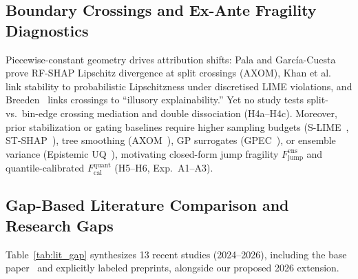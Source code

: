 \documentclass[conference]{IEEEtran}
\begin{document}
\subsection{Boundary Crossings and Ex-Ante Fragility Diagnostics}
Piecewise-constant geometry drives attribution shifts: Pala and Garc\'{i}a-Cuesta~\cite{pala2024} prove RF-SHAP Lipschitz divergence at split crossings (AXOM), Khan et al.~\cite{khan2024} link stability to probabilistic Lipschitzness under discretised LIME violations, and Breeden~\cite{breeden2026} links crossings to ``illusory explainability.'' Yet no study tests split- vs.\ bin-edge crossing mediation and double dissociation (H4a--H4c). Moreover, prior stabilization or gating baselines require higher sampling budgets (S-LIME~\cite{zhou2021}, ST-SHAP~\cite{kelodjou2024}), tree smoothing (AXOM~\cite{pala2024}), GP surrogates (GPEC~\cite{hill2024}), or ensemble variance (Epistemic UQ~\cite{mikriukov2026}), motivating closed-form jump fragility $F_{\mathrm{jump}}^{\mathrm{ens}}$ and quantile-calibrated $F_{\mathrm{cal}}^{\mathrm{quant}}$ (H5--H6, Exp.~A1--A3).

\subsection{Gap-Based Literature Comparison and Research Gaps}
Table~\ref{tab:lit_gap} synthesizes 13 recent studies (2024--2026), including the base paper~\cite{ballegeer2025} and explicitly labeled preprints, alongside our proposed 2026 extension.
\end{document}
